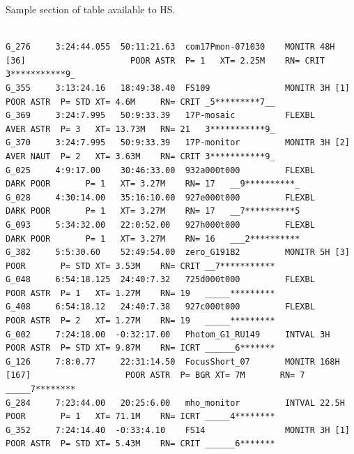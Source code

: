 \begin{landscape}

\begin{table}[h!]
  \begin{center}
  \end{center}
  \caption{Sample section of table available to HS.}
  \label{tab:example_gen}
\end{table}

\scriptsize
\begin{verbatim}

G_276     3:24:44.055  50:11:21.63  com17Pmon-071030    MONITR 48H [36]                     POOR ASTR  P= 1   XT= 2.25M    RN= CRIT 3***********9_
G_355     3:13:24.16   18:49:38.40  FS109               MONITR 3H [1]                       POOR ASTR  P= STD XT= 4.6M     RN= CRIT _5*********7__
G_369     3:24:7.995   50:9:33.39   17P-mosaic          FLEXBL                              AVER ASTR  P= 3   XT= 13.73M   RN= 21   3***********9_
G_370     3:24:7.995   50:9:33.39   17P-monitor         MONITR 3H [2]                       AVER NAUT  P= 2   XT= 3.63M    RN= CRIT 3***********9_
G_025     4:9:17.00    30:46:33.00  932a000t000         FLEXBL                         DARK POOR       P= 1   XT= 3.27M    RN= 17   __9**********_
G_028     4:30:14.00   35:16:10.00  927e000t000         FLEXBL                         DARK POOR       P= 1   XT= 3.27M    RN= 17   __7**********5
G_093     5:34:32.00   22:0:52.00   927h000t000         FLEXBL                         DARK POOR       P= 1   XT= 3.27M    RN= 16   ___2**********
G_382     5:5:30.60    52:49:54.00  zero_G191B2         MONITR 5H [3]                       POOR       P= STD XT= 3.53M    RN= CRIT __7***********
G_048     6:54:18.125  24:40:7.32   725d000t000         FLEXBL                              POOR ASTR  P= 1   XT= 1.27M    RN= 19   _____*********
G_408     6:54:18.12   24:40:7.38   927c000t000         FLEXBL                              POOR ASTR  P= 2   XT= 1.27M    RN= 19   _____*********
G_002     7:24:18.00  -0:32:17.00   Photom_G1_RU149     INTVAL 3H                           POOR ASTR  P= STD XT= 9.87M    RN= ICRT ______6*******
G_126     7:8:0.77     22:31:14.50  FocusShort_07       MONITR 168H [167]                   POOR ASTR  P= BGR XT= 7M       RN= 7    _____7********
G_284     7:23:44.00   20:25:6.00   mho_monitor         INTVAL 22.5H                        POOR       P= 1   XT= 71.1M    RN= ICRT _____4********
G_352     7:24:14.40  -0:33:4.10    FS14                MONITR 3H [1]                       POOR ASTR  P= STD XT= 5.43M    RN= CRIT ______6*******

\end{verbatim}
\end{landscape}
